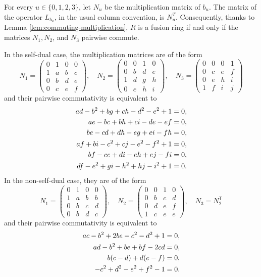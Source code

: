 \documentclass[11pt]{amsart}
\theoremstyle{definition}
\numberwithin{equation}{section}
\begin{document}
For every $u\in\{0,1,2,3\}$, let $N_u$ be the multiplication matrix of $b_u$. 
The matrix of the operator $L_{b_u}$, in the usual column convention, is $N_u^T$. 
Consequently, thanks to Lemma \ref{lem:commuting-multiplication}, $R$ is a fusion ring if and only if the matrices $N_1, N_2$, and $N_3$ pairwise commute.  

In the self-dual case, the multiplication matrices are of the form
\[
N_1=\begin{pmatrix}0&1&0&0\\1&a&b&c\\0&b&d&e\\0&c&e&f\end{pmatrix},\quad
N_2=\begin{pmatrix}0&0&1&0\\0&b&d&e\\1&d&g&h\\0&e&h&i\end{pmatrix},\quad
N_3=\begin{pmatrix}0&0&0&1\\0&c&e&f\\0&e&h&i\\1&f&i&j\end{pmatrix} 
\]
and their pairwise commutativity is equivalent to
\begin{align}
 ad-b^2+bg+ch-d^2-e^2+1&=0,\notag\\
 ae-bc+bh+ci-de-ef&=0,\notag\\
 be-cd+dh-eg+ei-fh&=0,\label{eq:sd-assoc}\\
 af+bi-c^2+cj-e^2-f^2+1&=0,\notag\\
 bf-ce+di-eh+ej-fi&=0,\notag\\
 df-e^2+gi-h^2+hj-i^2+1&=0.\notag
\end{align}
In the non-self-dual case, they are of the form \[
 N_1=\begin{pmatrix}0&1&0&0\\1&a&b&b\\0&b&c&d\\0&b&d&c\end{pmatrix},\quad
 N_2=\begin{pmatrix}0&0&1&0\\0&b&c&d\\0&d&e&f\\1&c&e&e\end{pmatrix},\quad
 N_3=N_2^{\mathsf T}
\]
and their pairwise commutativity is equivalent to
\begin{align}
 ac-b^2+2be-c^2-d^2+1&=0,\notag\\
 ad-b^2+be+bf-2cd&=0,\label{eq:ns-assoc}\\
 b(c-d)+d(e-f)&=0,\notag\\
 -c^2+d^2-e^2+f^2-1&=0.\notag
\end{align}
\end{document}

